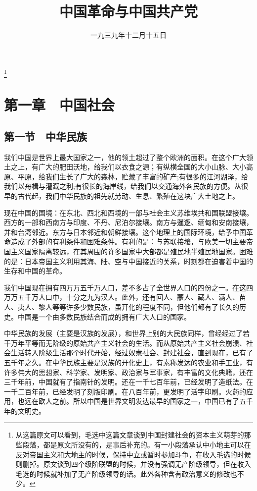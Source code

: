 
\title{中国革命与中国共产党}
\date{一九三九年十二月十五日}
\thanks{从这篇原文可以看到，毛选中这篇文章谈到中国封建社会的资本主义萌芽的那些段落，都是原文所没有的，是事后补充的。有一小段落承认中小地主可以在反对帝国主义和大地主的时候，保持中立或暂时参加斗争，在收入毛选的时候则删掉。原文谈到四个级阶联盟的时候，并没有强调无产阶级领导，但在收入毛选的时候就补加了无产阶级领导的话。此外各种含有政治意义的修改也不少。}
\maketitle



\section{第一章　中国社会}

\subsection{第一节　中华民族}

我们中国是世界上最大国家之一，他的领土超过了整个欧洲的面积。在这个广大领土之上，有广大的肥田沃地，给我们以衣食之源；有纵横全国的大小山脉、大小高原、平原，给我们生长了广大的森林，贮藏了丰富的矿产;有很多的江河湖泽，给我们以舟楫与灌溉之利;有很长的海岸线，给我们以交通海外各民族的方便。从很早的古代起，我们中华民族的祖先就劳动、生息、繁殖在这块广大土地之上。

现在中国的国境：在东北、西北和西境的一部与社会主义苏维埃共和国联盟接壤。西方的一部和西南方与印度、不丹、尼泊尔接壤。南方与暹逻、缅甸和安南接壤，并和台湾邻近。东方与日本邻近和朝鲜接壤。这个地理上的国际环境，给予中国革命造成了外部的有利条件和困难条件。有利的是：与苏联接壤，与欧美一切主要帝国主义国家隔离较远，在其周围的许多国家中大部都是殖民地半殖民地国家。困难的是：日本帝国主义利用其海、陆、空与中国接近的关系，时刻都在迫害着中国的生存和中国的革命。

我们中国现在拥有四万万五千万人口，差不多占了全世界人口的四份之一。在这四万万五千万人口中，十分之九为汉人。此外，还有回人、蒙人、藏人、满人、苗人、夷人、黎人等等许多少数民族，虽开化的程度不同，但他们都有了长久的历史。中国是一个由多数民族结合而成的拥有广大人口的国家。

中华民族的发展（主要是汉族的发展），和世界上别的大民族同样，曾经经过了若干万年平等而无阶级的原始共产主义社会的生活。而从原始共产主义社会崩溃、社会生活转入阶级生活那个时代开始，经过奴隶社会、封建社会，直到现在，已有了五千年之久。在中华民族主要是汉族的开化史上，有素称发达的农业和手工业，有许多伟大的思想家、科学家、发明家、政治家与军事家，有丰富的文化典籍，还在三千年前，中国就有了指南针的发明。还在一千七百年前，已经发明了造纸法。在一千二百年前，已经发明了刻版印刷。在八百年前，更发明了活字印刷。火药的应用，也远在欧人之前。所以中国是世界文明发达最早的国家之一，中国已有了五千年的文明史。


